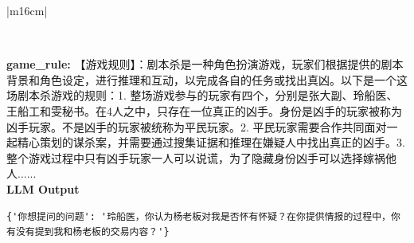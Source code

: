 \documentclass[11pt]{article}
\begin{document}
{\begin{CJK}{UTF8}{gbsn}
\begin{table}[ht!]
\begin{tabular}{|m{16cm}|}
\begin{minipage}[t]{\linewidth}
\begin{verbatim}
\end{verbatim}
\end{minipage} \\
 \textbf{   game\_rule:} \small【游戏规则】：剧本杀是一种角色扮演游戏，玩家们根据提供的剧本背景和角色设定，进行推理和互动，以完成各自的任务或找出真凶。以下是一个这场剧本杀游戏的规则：1. 整场游戏参与的玩家有四个，分别是张大副、玲船医、王船工和雯秘书。在4人之中，只存在一位真正的凶手。身份是凶手的玩家被称为凶手玩家。不是凶手的玩家被统称为平民玩家。2. 平民玩家需要合作共同面对一起精心策划的谋杀案，并需要通过搜集证据和推理在嫌疑人中找出真正的凶手。3. 整个游戏过程中只有凶手玩家一人可以说谎，为了隐藏身份凶手可以选择嫁祸他人...... \\

\hline
{}  \textbf{LLM Output}  \\
\hline
\begin{minipage}[t]{\linewidth}
\small\begin{verbatim}
{'你想提问的问题': '玲船医，你认为杨老板对我是否怀有怀疑？在你提供情报的过程中，你有没有提到我和杨老板的交易内容？'}

\end{verbatim}
\end{minipage} \\
\hline
\end{tabular}
\caption{LLM prompts and outputs for selecting other player and asking a question.}
\label{table:prompt_select_other_and_asking_question_cn}
\end{table}
\end{CJK}





}
\end{document}
